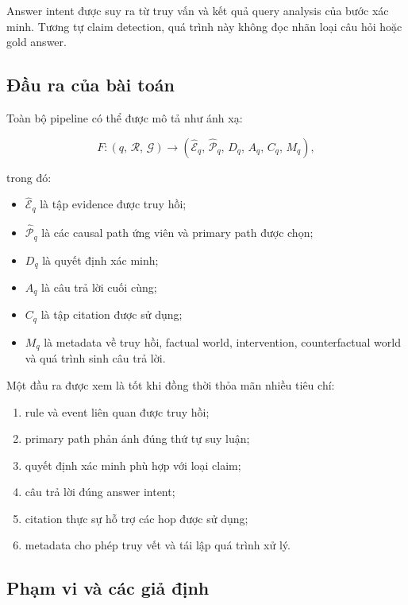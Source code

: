 Answer intent được suy ra từ truy vấn và kết quả query analysis của bước xác
minh. Tương tự claim detection, quá trình này không đọc nhãn loại câu hỏi
hoặc gold answer.

\subsection{Đầu ra của bài toán}

Toàn bộ pipeline có thể được mô tả như ánh xạ:

\begin{equation}
F:
\left(
    q,\,
    \mathcal{R},\,
    \mathcal{G}
\right)
\longrightarrow
\left(
    \widehat{\mathcal{E}}_q,\,
    \widehat{\mathcal{P}}_q,\,
    D_q,\,
    A_q,\,
    C_q,\,
    M_q
\right),
\end{equation}

trong đó:

\begin{itemize}
    \item \(\widehat{\mathcal{E}}_q\) là tập evidence được truy hồi;
    \item \(\widehat{\mathcal{P}}_q\) là các causal path ứng viên và primary
    path được chọn;
    \item \(D_q\) là quyết định xác minh;
    \item \(A_q\) là câu trả lời cuối cùng;
    \item \(C_q\) là tập citation được sử dụng;
    \item \(M_q\) là metadata về truy hồi, factual world, intervention,
    counterfactual world và quá trình sinh câu trả lời.
\end{itemize}

Một đầu ra được xem là tốt khi đồng thời thỏa mãn nhiều tiêu chí:

\begin{enumerate}
    \item rule và event liên quan được truy hồi;
    \item primary path phản ánh đúng thứ tự suy luận;
    \item quyết định xác minh phù hợp với loại claim;
    \item câu trả lời đúng answer intent;
    \item citation thực sự hỗ trợ các hop được sử dụng;
    \item metadata cho phép truy vết và tái lập quá trình xử lý.
\end{enumerate}

\subsection{Phạm vi và các giả định}

